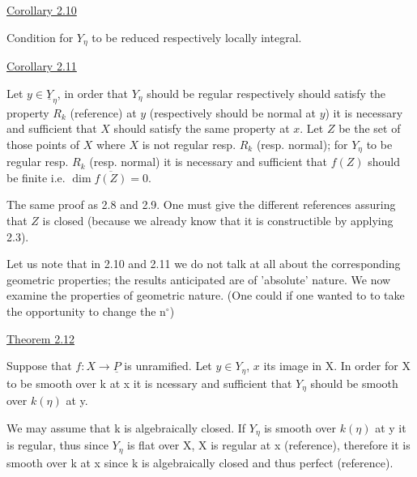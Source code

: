 \documentclass[11pt]{article}
\newcommand{\scanpage}[1]{\par\bigskip\noindent{\small\sffamily[scan #1]}\par}
\newcommand{\mspage}[1]{{\small\sffamily[p.\,#1]}}
\newcommand{\uline}[1]{\underline{#1}}
\begin{document}
\uline{Corollary 2.10}

Condition for $Y_\eta$ to be reduced respectively locally integral.

\uline{Corollary 2.11}

Let $y \in \underline{Y}_\eta$, in order that $Y_\eta$ should be regular respectively
should satisfy the property $R_k$ (reference) at $y$ (respectively
should be normal at $y$) it is necessary and sufficient that $X$
should satisfy the same property at $x$. Let $Z$ be the set of those
points of $X$ where $X$ is not regular resp. $R_k$ (resp. normal); for $Y_\eta$
to be regular resp. $R_k$ (resp. normal) it is necessary and
sufficient that $f(Z)$ should be finite i.e. $\dim \overline{f(Z)} = 0$.

The same proof as 2.8 and 2.9. One must give the different
references assuring that $Z$ is closed (because we already know that
it is constructible by applying 2.3).

\clearpage
\scanpage{24/15}
\mspage{15}

Let us note that in 2.10 and 2.11 we do not talk at all about
the corresponding geometric properties; the results anticipated
are of 'absolute' nature.  We now examine the properties of
geometric nature. (One could if one wanted to to take the
opportunity to change the n$^\circ$)

\uline{Theorem 2.12}

Suppose that $f{:}X \to \underline{P}$ is unramified.  Let $y \in Y_{\eta}$, $x$ its image
in X.  In order for X to be smooth over k at x it is ncessary and
sufficient that $Y_{\eta}$ should be smooth over $k(\eta)$ at y.

We may assume that k is algebraically closed.  If $Y_{\eta}$ is smooth
over $k(\eta)$ at y it is regular, thus since $Y_{\eta}$ is flat over X, X is
regular at x (reference), therefore it is smooth over k at x since
k is algebraically closed and thus perfect (reference).
\end{document}
